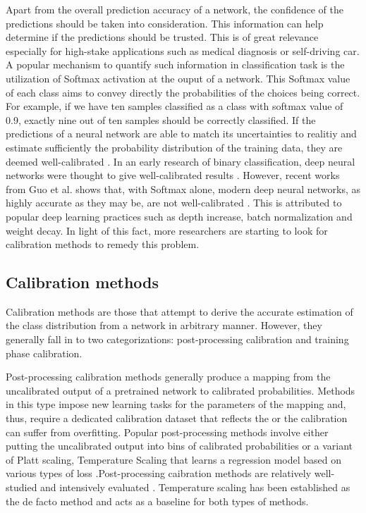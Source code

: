 \documentclass[a4paper]{article}
\begin{document}
Apart from the overall prediction accuracy of a network, the confidence of the predictions should be taken into consideration. This information can help determine if the predictions should be trusted. This is of great relevance especially for high-stake applications such as medical diagnosis or self-driving car. A popular mechanism to quantify such information in classification task is the utilization of Softmax activation at the ouput of a network. This Softmax value of each class aims to convey directly the probabilities of the choices being correct. For example, if we have ten samples classified as a class with softmax value of 0.9, exactly nine out of ten samples should be correctly classified. If the predictions of a neural network are able to match its uncertainties to realitiy and estimate sufficiently the probability distribution of the training data, they are deemed well-calibrated \cite{DBLP:journals/corr/GuoPSW17, DBLP:thesis/calibration}. In an early research of binary classification, deep neural networks were thought to give well-calibrated results \cite{niculescu2005predicting}. However, recent works from Guo et al. shows that, with Softmax alone, modern deep neural networks, as highly accurate as they may be, are not well-calibrated \cite{DBLP:journals/corr/GuoPSW17}. This is attributed to popular deep learning practices such as depth increase, batch normalization and weight decay. In light of this fact, more researchers are starting to look for calibration methods to remedy this problem.

\subsection{Calibration methods}
Calibration methods are those that attempt to derive the accurate estimation of the class distribution from a network in arbitrary manner. However, they generally fall in to two categorizations: post-processing calibration and training phase calibration.

Post-processing calibration methods generally produce a mapping from the uncalibrated output of a pretrained network to calibrated probabilities. Methods in this type impose new learning tasks for the parameters of the mapping and, thus, require a dedicated calibration dataset that reflects the or the calibration can suffer from overfitting. Popular post-processing methods involve either putting the uncalibrated output into bins of calibrated probabilities \cite{Zadrozny:2001:OCP:645530.655658, Zadrozny:2002:TCS:775047.775151, DBLP:journals/corr/binning} or a variant of Platt scaling, Temperature Scaling \cite{Platt99probabilisticoutputs, DBLP:journals/corr/GuoPSW17, kuleshov2018accurate} that learns a regression model based on various types of loss \cite{mozafari2018new}.Post-processing caibration methods are relatively well-studied and intensively evaluated \cite{DBLP:thesis/calibration}. Temperature scaling has been established as the de facto method and acts as a baseline for both types of methods.
\end{document}
